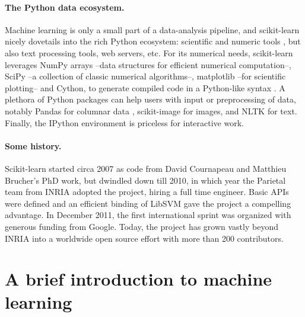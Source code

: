 \documentclass[a4paper]{article}
\begin{document}
\paragraph{The Python data ecosystem.}
%
Machine learning is only a small part of a data-analysis pipeline, and
scikit-learn nicely dovetails into the rich Python ecosystem: scientific
and numeric tools \cite{oliphant2007python,varoquaux2013scipy}, but also
text processing tools, web servers, etc.
%
For its numerical needs, scikit-learn leverages NumPy arrays
\cite{vanderwalt2011} --data structures for efficient numerical
computation--, SciPy --a collection of classic numerical algorithms--,
matplotlib \cite{hunter2007matplotlib} --for scientific plotting-- and
Cython, to generate compiled code in a Python-like syntax
\cite{behnel2011cython}.
%
A plethora of Python packages can help users with input or preprocessing
of data, notably Pandas for columnar data \cite{mckinney2012}, scikit-image
for images, and NLTK for text. Finally, the IPython environment
\cite{perez2007ipython} is priceless for interactive work.

\paragraph{Some history.}
%
Scikit-learn started circa 2007 as code from David Cournapeau and
Matthieu Brucher's PhD work, but dwindled down till 2010, in which year the
Parietal team from INRIA adopted the project, hiring a full time
engineer. Basic APIs were defined and an efficient binding of LibSVM
\cite{chang2011libsvm} gave the project a compelling advantage. In
December 2011, the first international sprint was organized with generous
funding from Google. Today, the project has grown vastly beyond
INRIA into a worldwide open source effort with more than 200 contributors.

\section{A brief introduction to machine learning}
\end{document}
